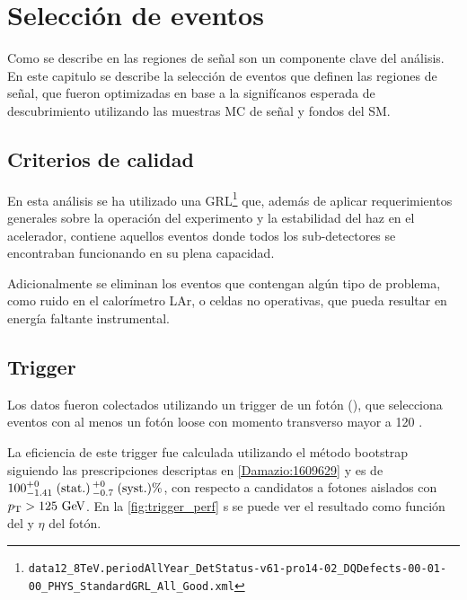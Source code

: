 \chapter{Selección de eventos}\label{cap:seleccion}


Como se describe en {\XXX} las regiones de señal son un componente clave del
análisis.
En este capitulo se describe la selección de eventos que definen las regiones de
señal, que fueron optimizadas en base a la signifícanos esperada de
descubrimiento utilizando las muestras MC de señal y fondos del SM.



\section{Criterios de calidad}


En esta análisis se ha utilizado una
GRL\footnote{\texttt{data12\_8TeV.periodAllYear\_DetStatus-v61-pro14-02\_DQDefects-00-01-00\_PHYS\_StandardGRL\_All\_Good.xml}}
que, además de aplicar requerimientos generales sobre la operación del
experimento y la estabilidad del haz en el acelerador, contiene aquellos eventos
donde todos los sub-detectores se encontraban funcionando en su plena capacidad.

Adicionalmente se eliminan los eventos que contengan algún tipo de problema,
como ruido en el calorímetro LAr, o celdas no operativas, que pueda resultar
en energía faltante instrumental. %



\section{Trigger}\label{sec:trigger}

Los datos fueron colectados utilizando un trigger de un fotón (\trigchain), que
selecciona eventos con al menos un fotón loose con momento transverso mayor a
120 \gev.

La eficiencia de este trigger fue calculada utilizando el método bootstrap
siguiendo las prescripciones descriptas en \cref{Damazio:1609629} y es de
$100^{+0}_{-1.41}\mbox{$\;$(stat.)} \, {}^{+0}_{-0.7}\mbox{$\;$(syst.)} \%$, con respecto a candidatos a
fotones aislados con $\pt>125 \gev$.
En la \cref{fig:trigger_perf} s se puede ver el resultado como función del {\pt}
y $\eta$ del fotón. 

